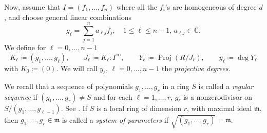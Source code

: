 \documentclass[11pt,letterpaper]{article}
\numberwithin{equation}{section}
\newcommand{\CC}{\mathbb{C}}
\DeclareMathOperator{\Proj}{Proj}
\begin{document}
Now, assume that $I=(f_1,\dots,f_n)$ where all the $f_i$'s are homogeneous of degree $d$, and choose general linear combinations \[
g_\ell = \sum_{j=1}^n a_{\ell j} f_j,\quad 1\leq \ell\leq n-1, \, a_{\ell j}\in \CC.
\] We define for $\ell=0,\dots,n-1$ \[
K_\ell \coloneqq (g_1,\dots,g_\ell),\qquad J_\ell \coloneqq K_\ell : I^\infty,\qquad Y_\ell \coloneqq \Proj(R/J_\ell),\qquad y_\ell\coloneqq\deg Y_\ell
\] with $K_0\coloneqq (0)$.
We will call $y_\ell,\, \ell=0,\dots,n-1$ the \emph{projective degrees}.

We recall that a sequence of polynomials $g_1,\dots,g_r$ in a ring $S$ is called a \emph{regular sequence} if $(g_1,\dots,g_r)\neq S$ and for each $\ell=1,\dots,r$, $g_\ell$ is a nonzerodivisor on $S/(g_1,\dots,g_{\ell-1})$.
See \cite[Chapter~17]{Eisenbud-95}.
If $S$ is a local ring of dimension $r$, with maximal ideal $\mathfrak{m}$, then $g_1,\dots,g_r\in\mathfrak{m}$ is called a \emph{system of parameters} if $\sqrt{(g_1,\dots,g_r)}=\mathfrak{m}$.
\end{document}
